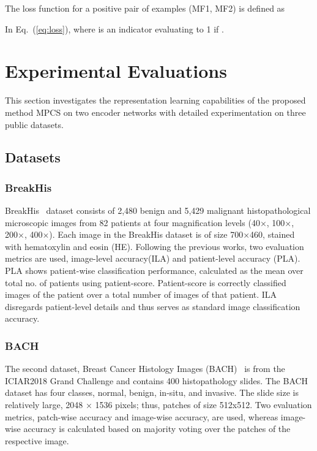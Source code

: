 \documentclass[conference]{IEEEtran}
\begin{document}
The loss function for a positive pair of examples (MF1, MF2) is defined as

\begin{comment}




\end{comment}

In Eq.~(\ref{eq:loss}), where  is an indicator evaluating to 1 if .











  \label{methdology}



\section{Experimental Evaluations}
This section investigates the representation learning capabilities of the proposed method MPCS on two encoder networks with detailed experimentation on three public datasets.
\subsection{Datasets}
\subsubsection{BreakHis}
BreakHis~\cite{spanhol2016dataset} dataset consists of 2,480 benign and 5,429 malignant histopathological microscopic images from 82 patients at four magnification levels (40×, 100×, 200×, 400×). Each image in the BreakHis dataset is of size 700×460, stained with hematoxylin and eosin (HE). Following the previous works, two evaluation metrics are used, image-level accuracy(ILA) and patient-level accuracy (PLA). PLA shows patient-wise classification performance, calculated as the mean over total no. of patients using patient-score. Patient-score is correctly classified images of the patient over a total number of images of that patient. ILA disregards patient-level details and thus serves as standard image classification accuracy.    
\subsubsection{BACH}
The second dataset, Breast Cancer Histology Images (BACH)~\cite{aresta2019bach} is from the ICIAR2018 Grand Challenge and contains 400 histopathology slides. The BACH dataset has four classes, normal, benign, in-situ, and invasive. The slide size is relatively large, 2048 × 1536 pixels; thus, patches of size 512x512. Two evaluation metrics, patch-wise accuracy and image-wise accuracy, are used, whereas image-wise accuracy is calculated based on majority voting over the patches of the respective image.
\end{document}
